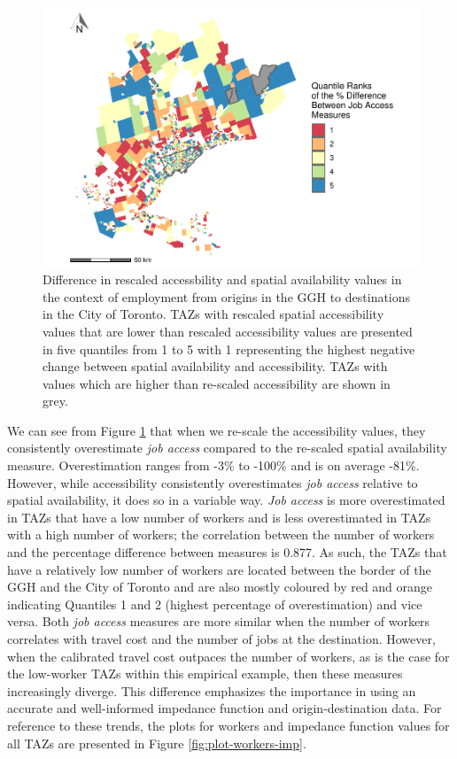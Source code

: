 \documentclass[]{elsarticle} %
\begin{document}
\begin{figure}
\includegraphics[width=1\linewidth]{Spatial-Availability_files/figure-latex/indexed-measures-comparison-plot-1} \caption{\label{fig:indexed-measures-comparison-plot}Difference in rescaled accessbility and spatial availability values in the context of employment from origins in the GGH to destinations in the City of Toronto. TAZs with rescaled spatial accessibility values that are lower than rescaled accessibility values are presented in five quantiles from 1 to 5 with 1 representing the highest negative change between spatial availability and accessibility. TAZs with values which are higher than re-scaled accessibility are shown in grey.}\label{fig:indexed-measures-comparison-plot}
\end{figure}

We can see from Figure \ref{fig:indexed-measures-comparison-plot} that
when we re-scale the accessibility values, they consistently
overestimate \emph{job access} compared to the re-scaled spatial
availability measure. Overestimation ranges from -3\% to -100\% and is
on average -81\%. However, while accessibility consistently
overestimates \emph{job access} relative to spatial availability, it
does so in a variable way. \emph{Job access} is more overestimated in
TAZs that have a low number of workers and is less overestimated in TAZs
with a high number of workers; the correlation between the number of
workers and the percentage difference between measures is 0.877. As
such, the TAZs that have a relatively low number of workers are located
between the border of the GGH and the City of Toronto and are also
mostly coloured by red and orange indicating Quantiles 1 and 2 (highest
percentage of overestimation) and vice versa. Both \emph{job access}
measures are more similar when the number of workers correlates with
travel cost and the number of jobs at the destination. However, when the
calibrated travel cost outpaces the number of workers, as is the case
for the low-worker TAZs within this empirical example, then these
measures increasingly diverge. This difference emphasizes the importance
in using an accurate and well-informed impedance function and
origin-destination data. For reference to these trends, the plots for
workers and impedance function values for all TAZs are presented in
Figure \ref{fig:plot-workers-imp}.
\end{document}
